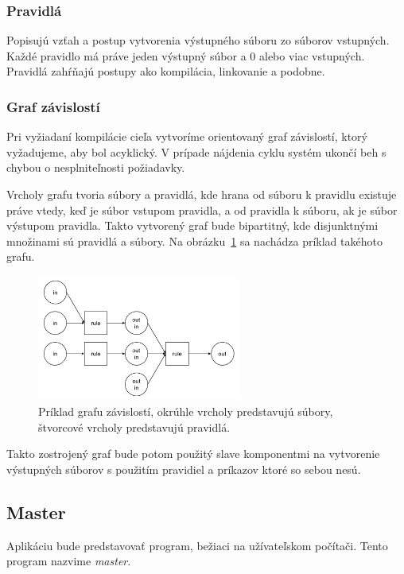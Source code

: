 \subsubsection{Pravidlá}
Popisujú vzťah a postup vytvorenia výstupného súboru zo súborov vstupných.
Každé pravidlo má práve jeden výstupný súbor a 0 alebo viac vstupných. Pravidlá
zahŕňajú postupy ako kompilácia, linkovanie a podobne.

\subsubsection{Graf závislostí}

Pri vyžiadaní kompilácie cieľa vytvoríme orientovaný graf závislostí, ktorý vyžadujeme,
aby bol acyklický. V prípade nájdenia cyklu systém ukončí beh s chybou o nesplniteľnosti
požiadavky.

Vrcholy grafu tvoria súbory a pravidlá, kde hrana od súboru k pravidlu existuje
práve vtedy, keď je súbor vstupom pravidla, a od pravidla k súboru, ak je súbor
výstupom pravidla. Takto vytvorený graf bude bipartitný, kde disjunktnými množinami
sú pravidlá a súbory. Na obrázku~\ref{img:dependency_graph} sa nachádza príklad
takéhoto grafu.

\begin{figure}[h]
  \centerline{\includegraphics[width=0.6\textwidth]{images/dependency_graph}}
  \caption[Graf závislostí]{Príklad grafu závislostí, okrúhle vrcholy predstavujú
  súbory, štvorcové vrcholy predstavujú pravidlá.}
  \label{img:dependency_graph}
\end{figure}

Takto zostrojený graf bude potom použitý slave komponentmi na vytvorenie výstupných
súborov s použitím pravidiel a príkazov ktoré so sebou nesú.

\subsection{Master}
\label{sub:solution:master}
Aplikáciu bude predstavovať program, bežiaci na užívateľskom počítači. Tento program
nazvime {\it master}.

